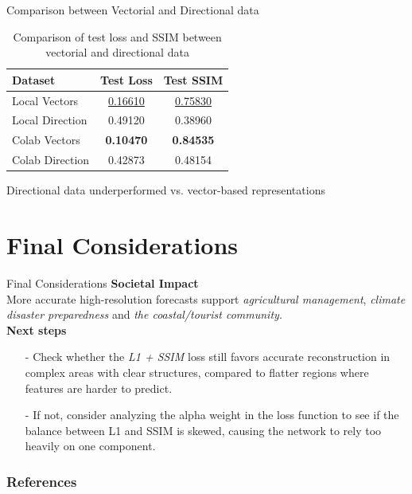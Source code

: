 \documentclass[footline=authortitle]{beamer}
\begin{document}
\begin{frame}{Comparison between Vectorial and Directional data}
    \begin{table}[h!]
    \centering
    \begin{tabular}{|l|c|c|}
    \hline
    \textbf{Dataset} & \textbf{Test Loss} & \textbf{Test SSIM} \\
    \hline
    Local Vectors & \underline{0.16610} & \underline{0.75830} \\
    Local Direction & 0.49120 & 0.38960 \\
    Colab Vectors & \textbf{0.10470} & \textbf{0.84535} \\
    Colab Direction & 0.42873 & 0.48154 \\
    \hline
    \end{tabular}
    \caption{Comparison of test loss and SSIM between vectorial and directional data}
    \label{tab:test_results}
    \end{table}
    Directional data underperformed vs. vector-based representations
\end{frame}

\section{Final Considerations}
\begin{frame}{Final Considerations}
\justifying
    \textbf{Societal Impact}
    \\More accurate high-resolution forecasts support \textit{agricultural management}, \textit{climate disaster preparedness} and \textit{the coastal/tourist community}.\\\vspace{0.5cm}
    \textbf{Next steps}
    \begin{itemize}
    \justifying
        \item[-] Check whether the \textit{L1 + SSIM} loss still favors accurate reconstruction in complex areas with clear structures, compared to flatter regions where features are harder to predict.
        \item[-] If not, consider analyzing the alpha weight in the loss function to see if the balance between L1 and SSIM is skewed, causing the network to rely too heavily on one component.
    \end{itemize}
\end{frame}

\begin{frame}
    \frametitle{References}
    \printbibliography
\end{frame}
\end{document}

